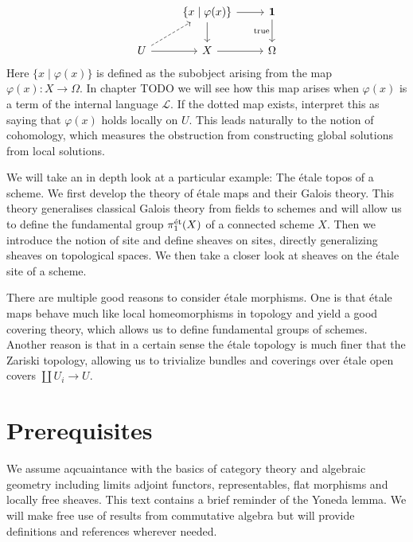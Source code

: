 \[
	\begin{tikzcd}
		& {\{x \mid \varphi(x)\}} & {\mathbf{1}} \\
		U & X & \Omega
		\arrow[from=2-1, to=2-2]
		\arrow[dashed, from=2-1, to=1-2]
		\arrow[from=1-2, to=1-3]
		\arrow["{\text{true}}"', from=1-3, to=2-3]
		\arrow[from=1-2, to=2-2]
		\arrow[from=2-2, to=2-3]
	\end{tikzcd}
\]
Here $\{ x \mid \varphi(x)\}$ is defined as the subobject arising from the map $\varphi(x) \colon X \to \Omega$. In chapter TODO we will see how this map arises when $\varphi(x)$ is a term of the internal language $\mathcal{L}$. If the dotted map exists, interpret this as saying that $\varphi(x)$ holds locally on $U$. This leads naturally to the notion of cohomology, which measures the obstruction from constructing global solutions from local solutions.\par

We will take an in depth look at a particular example: The \'etale topos of a scheme. We first develop the theory of \'etale maps and their Galois theory. This theory generalises classical Galois theory from fields to schemes and will allow us to define the fundamental group $\pi_1^{\text{\'et}}(X)$ of a connected scheme $X$. Then we introduce the notion of site and define sheaves on sites, directly generalizing sheaves on topological spaces. We then take a closer look at sheaves on the \'etale site of a scheme.\par

There are multiple good reasons to consider \'etale morphisms. One is that \'etale maps behave much like local homeomorphisms in topology and yield a good covering theory, which allows us to define fundamental groups of schemes. Another reason is that in a certain sense the \'etale topology is much finer that the Zariski topology, allowing us to trivialize bundles and coverings over \'etale open covers $\coprod U_i \to U$.

\section{Prerequisites}
We assume aqcuaintance with the basics of category theory and algebraic geometry including limits adjoint functors, representables, flat morphisms and locally free sheaves. This text contains a brief reminder of the Yoneda lemma. We will make free use of results from commutative algebra but will provide definitions and references wherever needed.

